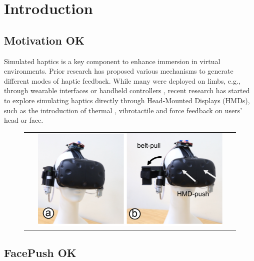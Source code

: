 \chapter{Introduction} \label{chapter:introduction}

\section{Motivation OK}
Simulated haptics is a key component to enhance immersion in virtual environments. Prior research has proposed various mechanisms to generate different modes of haptic feedback. While many were deployed on limbs, e.g., through wearable interfaces \cite{Impacto} or handheld controllers \cite{normalTouch, hapticLink}, recent research has started to explore simulating haptics directly through Head-Mounted Displays (HMDs),  such as the introduction of thermal \cite{ThermoVR, Ambiotherm}, vibrotactile \cite{HapticHead} and force \cite{GyroVR, HangerOVER} feedback on users' head or face.

\begin{figure}[h]
    \begin{center}
        \begin{tabular}{@{\hspace{0.1cm}}c}
           \includegraphics[width=0.9\textwidth]{figures/FacePush.pdf}
        \end{tabular}
        \label{fig:FacePush Intro}
    \end{center}
\end{figure}

\section{FacePush OK}



